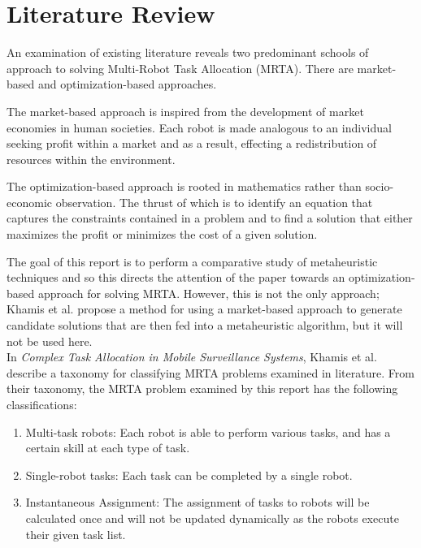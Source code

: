 \documentclass[a4paper]{article}
\begin{document}
\section{Literature Review}

An examination of existing literature reveals two predominant schools of approach to solving Multi-Robot Task Allocation (MRTA). There are market-based and optimization-based approaches.

The market-based approach is inspired from the development of market economies in human societies.
Each robot is made analogous to an individual seeking profit within a market and as a result, effecting a redistribution of resources within the environment.

The optimization-based approach is rooted in mathematics rather than socio-economic observation.
The thrust of which is to identify an equation that captures the constraints contained in a problem and to find a solution that either maximizes the profit or minimizes the cost of a given solution.

The goal of this report is to perform a comparative study of metaheuristic techniques and so this directs the attention of the paper towards an optimization-based approach for solving MRTA. However, this is not the only approach; Khamis et al.\cite{Khamis} propose a method for using a market-based approach to generate candidate solutions that are then fed into a metaheuristic algorithm, but it will not be used here.\\

In \textit{Complex Task Allocation in Mobile Surveillance Systems}\cite{Khamis}, Khamis et al. describe a taxonomy for classifying MRTA problems examined in literature. From their taxonomy, the MRTA problem examined by this report has the following classifications:

\begin{enumerate}
\item Multi-task robots: Each robot is able to perform various tasks, and has a certain skill at each type of task.
\item Single-robot tasks: Each task can be completed by a single robot.
\item Instantaneous Assignment: The assignment of tasks to robots will be calculated once and will not be updated dynamically as the robots execute their given task list.
\end{enumerate}
\end{document}
